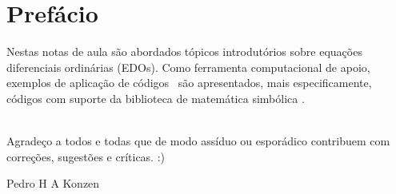 
\chapter*{Prefácio}\label{prefacio}

Nestas notas de aula são abordados tópicos introdutórios sobre equações diferenciais ordinárias (EDOs). Como ferramenta computacional de apoio, exemplos de aplicação de códigos \python\, são apresentados, mais especificamente, códigos com suporte da biblioteca de matemática simbólica \sympy.

~\\

Agradeço a todos e todas que de modo assíduo ou esporádico contribuem com correções, sugestões e críticas. :)

\begin{flushright}
  Pedro H A Konzen
\end{flushright}

